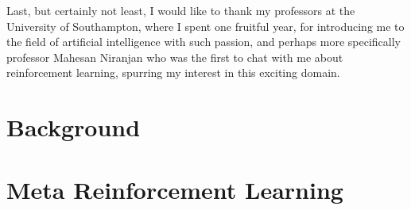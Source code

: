 \documentclass[11pt,a4paper,oneside]{book}
\begin{document}
Last, but certainly not least, I would like to thank my professors at the
University of Southampton, where I spent one fruitful year, 
for introducing me to the field of artificial
intelligence with such passion, and perhaps more specifically professor
Mahesan Niranjan who was the first to chat with me about reinforcement learning,
spurring my interest in this exciting domain.


\thispagestyle{empty} 
\setcounter{page}{0}
\tableofcontents
\mainmatter 




\part{Background}



\part{Meta Reinforcement Learning}









\backmatter

 
\end{document}
